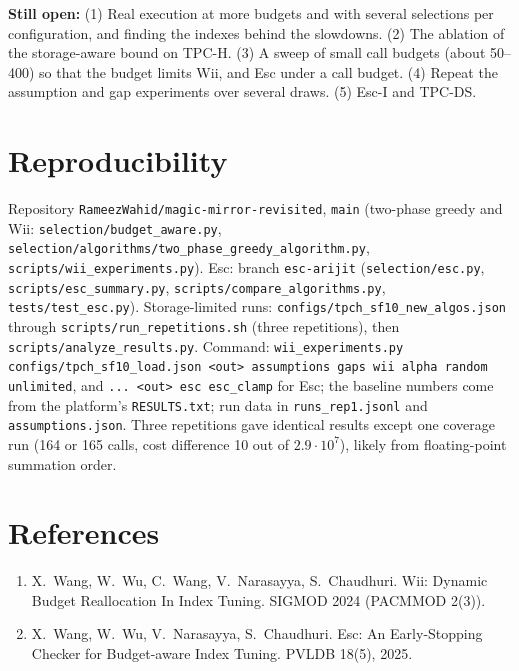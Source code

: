 \documentclass[11pt,a4paper]{article}
\begin{document}
\textbf{Still open:} (1) Real execution at more budgets and with several selections per configuration, and finding the indexes behind the slowdowns. (2) The ablation of the storage-aware bound on TPC-H. (3) A sweep of small call budgets (about 50--400) so that the budget limits Wii, and Esc under a call budget. (4) Repeat the assumption and gap experiments over several draws. (5) Esc-I and TPC-DS.

\section*{Reproducibility}
Repository \texttt{RameezWahid/magic-mirror-revisited}, \texttt{main} (two-phase greedy and Wii: \texttt{selection/budget\_aware.py}, \texttt{selection/algorithms/two\_phase\_greedy\_algorithm.py}, \texttt{scripts/wii\_experiments.py}). Esc: branch \texttt{esc-arijit} (\texttt{selection/esc.py}, \texttt{scripts/esc\_summary.py}, \texttt{scripts/compare\_algorithms.py}, \texttt{tests/test\_esc.py}). Storage-limited runs: \texttt{configs/tpch\_sf10\_new\_algos.json} through \texttt{scripts/run\_repetitions.sh} (three repetitions), then \texttt{scripts/analyze\_results.py}. Command: \texttt{wii\_experiments.py configs/tpch\_sf10\_load.json <out> assumptions gaps wii alpha random unlimited}, and \texttt{... <out> esc esc\_clamp} for Esc; the baseline numbers come from the platform's \texttt{RESULTS.txt}; run data in \texttt{runs\_rep1.jsonl} and \texttt{assumptions.json}. Three repetitions gave identical results except one coverage run (164 or 165 calls, cost difference 10 out of $2.9\cdot10^7$), likely from floating-point summation order.

\section*{References}
\begin{enumerate}\small
\item X.\ Wang, W.\ Wu, C.\ Wang, V.\ Narasayya, S.\ Chaudhuri. Wii: Dynamic Budget Reallocation In Index Tuning. SIGMOD 2024 (PACMMOD 2(3)).
\item X.\ Wang, W.\ Wu, V.\ Narasayya, S.\ Chaudhuri. Esc: An Early-Stopping Checker for Budget-aware Index Tuning. PVLDB 18(5), 2025.
\end{enumerate}
\end{document}
